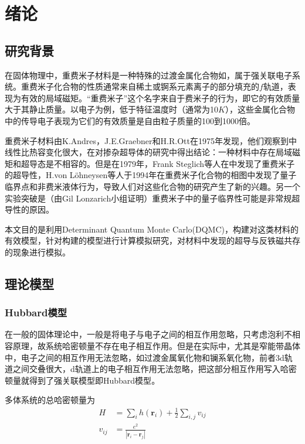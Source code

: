 \section{绪论}
\subsection{研究背景}
在固体物理中，重费米子材料是一种特殊的过渡金属化合物如，属于强关联电子系统。重费米子化合物的性质通常来自稀土或锕系元素离子的部分填充的$f$轨道，表现为有效的局域磁矩。“重费米子”这个名字来自于费米子的行为，即它的有效质量大于其静止质量。以电子为例，低于特征温度时（通常为10$K$），这些金属化合物中的传导电子表现为它们的有效质量是自由粒子质量的100到1000倍。

重费米子材料由K.Andres，J.E.Graebner和H.R.Ott在1975年发现，他们观察到中线性比热容变化很大，在对掺杂超导体的研究中得出结论：一种材料中存在局域磁矩和超导态是不相容的。但是在1979年，Frank Steglich等人在中发现了重费米子的超导性，H.von Löhneysen等人于1994年在重费米子化合物的相图中发现了量子临界点和非费米液体行为，导致人们对这些化合物的研究产生了新的兴趣。另一个实验突破是（由Gil Lonzarich小组证明）重费米子中的量子临界性可能是非常规超导性的原因。


本文目的是利用Determinant Quantum Monte Carlo(DQMC)，构建对这类材料的有效模型，针对构建的模型进行计算模拟研究，对材料中发现的超导与反铁磁共存的现象进行模拟。






\subsection{理论模型}

\subsubsection{Hubbard模型}
在一般的固体理论中，一般是将电子与电子之间的相互作用忽略，只考虑泡利不相容原理，故系统哈密顿量不存在电子相互作用。但是在实际中，尤其是窄能带晶体中，电子之间的相互作用无法忽略，如过渡金属氧化物和镧系氧化物，前者3d轨道之间交叠很大，d轨道上的电子相互作用无法忽略，把这部分相互作用写入哈密顿量就得到了强关联模型即Hubbard模型\cite{1}。

多体系统的总哈密顿量为
\begin{align*}
    H&=\sum_i h(\textbf{r}_i)+\frac{1}{2}\sum_{i,j}v_{ij}\\
    v_{ij}&=\frac{e^2}{|\textbf{r}_i-\textbf{r}_j|}
\end{align*}

